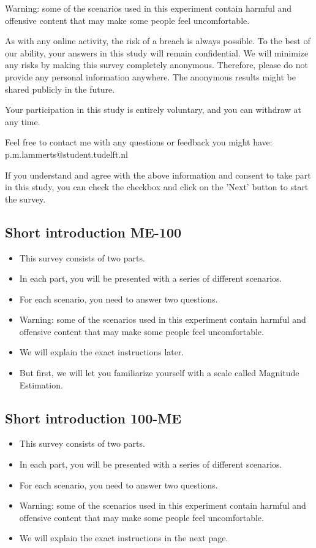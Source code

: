 \documentclass[a4paper]{article}
\begin{document}
Warning: some of the scenarios used in this experiment contain harmful and offensive content that may make some people feel uncomfortable.

As with any online activity, the risk of a breach is always possible. To the best of our ability, your answers in this study will remain confidential. We will minimize any risks by making this survey completely anonymous. Therefore, please do not provide any personal information anywhere. The anonymous results might be shared publicly in the future.

Your participation in this study is entirely voluntary, and you can withdraw at any time.

Feel free to contact me with any questions or feedback you might have:
p.m.lammerts@student.tudelft.nl

If you understand and agree with the above information and consent to take part in this study, you can check the checkbox and click on the 'Next' button to start the survey.


\subsection{Short introduction ME-100}
\begin{itemize}
    \item This survey consists of two parts.
    \item In each part, you will be presented with a series of different scenarios.
    \item For each scenario, you need to answer two questions.
    \item Warning: some of the scenarios used in this experiment contain harmful and offensive content that may make some people feel uncomfortable.
    \item We will explain the exact instructions later.
    \item But first, we will let you familiarize yourself with a scale called Magnitude Estimation.
\end{itemize}

\subsection{Short introduction 100-ME}
\begin{itemize}
    \item This survey consists of two parts.
    \item In each part, you will be presented with a series of different scenarios.
    \item For each scenario, you need to answer two questions.
    \item Warning: some of the scenarios used in this experiment contain harmful and offensive content that may
          make some people feel uncomfortable.
    \item We will explain the exact instructions in the next page.
\end{itemize}
\end{document}
